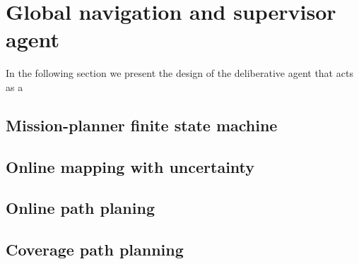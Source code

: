 \documentclass[11pt]{article}
\begin{document}
\section{Global navigation and supervisor agent}

In the following section we present the design of the deliberative agent that acts as a

\subsection{Mission-planner finite state machine}

\subsection{Online mapping with uncertainty}

\subsection{Online path planing}

\subsection{Coverage path planning}

\cite{epsilon_star} \cite{Galceran13asurvey} \cite{recsplit}

\tableofcontents

\printbibliography %
\end{document}
